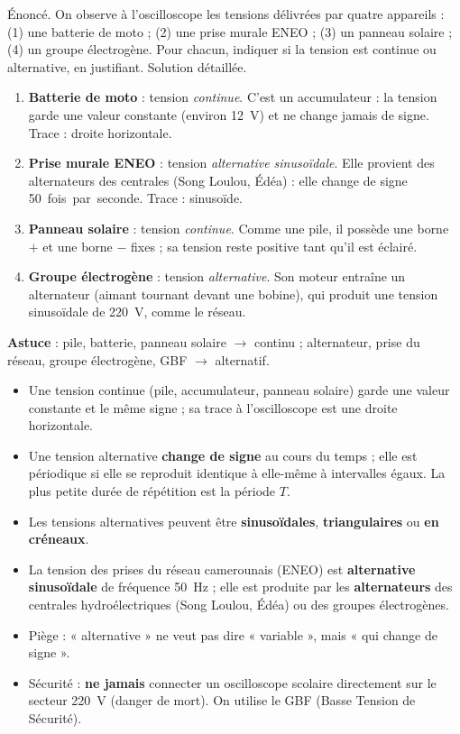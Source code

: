 \documentclass[11pt]{article}
\newcommand{\cle}[1]{{\popxbold\color{popdark}#1}}
\begin{document}
\begin{exoresolu}
Énoncé. On observe à l'oscilloscope les tensions délivrées par quatre appareils : (1) une batterie de moto ; (2) une prise murale ENEO ; (3) un panneau solaire ; (4) un groupe électrogène. Pour chacun, indiquer si la tension est continue ou alternative, en justifiant.
\tcblower
Solution détaillée.
\begin{enumerate}
\item \textbf{Batterie de moto} : tension \emph{continue}. C'est un accumulateur : la tension garde une valeur constante (environ \SI{12}{V}) et ne change jamais de signe. Trace : droite horizontale.
\item \textbf{Prise murale ENEO} : tension \emph{alternative sinusoïdale}. Elle provient des alternateurs des centrales (Song Loulou, Édéa) : elle change de signe \SI{50}{fois par seconde}. Trace : sinusoïde.
\item \textbf{Panneau solaire} : tension \emph{continue}. Comme une pile, il possède une borne $+$ et une borne $-$ fixes ; sa tension reste positive tant qu'il est éclairé.
\item \textbf{Groupe électrogène} : tension \emph{alternative}. Son moteur entraîne un alternateur (aimant tournant devant une bobine), qui produit une tension sinusoïdale de \SI{220}{V}, comme le réseau.
\end{enumerate}
\textbf{Astuce} : pile, batterie, panneau solaire $\rightarrow$ continu ; alternateur, prise du réseau, groupe électrogène, GBF $\rightarrow$ alternatif.
\end{exoresolu}

\begin{aretenir}
\begin{itemize}
\item Une tension \cle{continue} (pile, accumulateur, panneau solaire) garde une valeur constante et le même signe ; sa trace à l'oscilloscope est une droite horizontale.
\item Une tension \cle{alternative} \textbf{change de signe} au cours du temps ; elle est \cle{périodique} si elle se reproduit identique à elle-même à intervalles égaux. La plus petite durée de répétition est la \cle{période} $T$.
\item Les tensions alternatives peuvent être \textbf{sinusoïdales}, \textbf{triangulaires} ou \textbf{en créneaux}.
\item La tension des prises du réseau camerounais (ENEO) est \textbf{alternative sinusoïdale} de fréquence \SI{50}{Hz} ; elle est produite par les \textbf{alternateurs} des centrales hydroélectriques (Song Loulou, Édéa) ou des groupes électrogènes.
\item Piège : « alternative » ne veut pas dire « variable », mais « qui change de signe ».
\item Sécurité : \textbf{ne jamais} connecter un oscilloscope scolaire directement sur le secteur \SI{220}{V} (danger de mort). On utilise le GBF (Basse Tension de Sécurité).
\end{itemize}
\end{aretenir}
\end{document}

